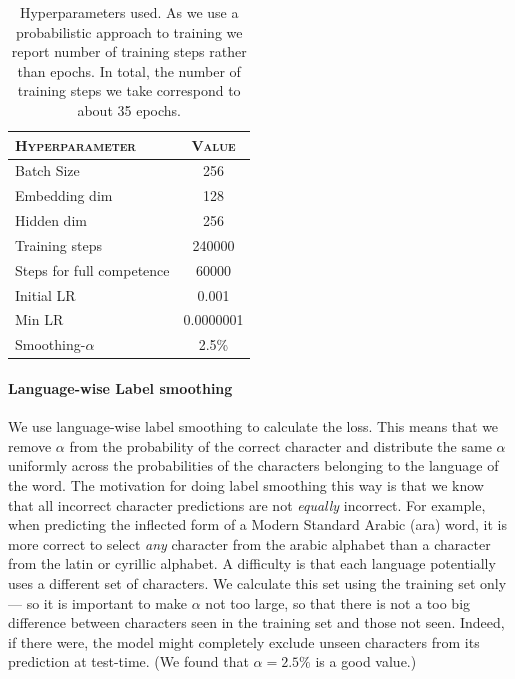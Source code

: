 \documentclass[11pt,a4paper]{article}
\begin{document}
\begin{table}[ht!]	
\centering
\begin{tabular}{lc}
\textsc{Hyperparameter} & \textsc{Value} \\
  \hline
  Batch Size & 256 \\
  Embedding dim & 128 \\
  Hidden dim & 256 \\
  Training steps & 240000 \\
  Steps for full competence & 60000 \\
  Initial LR & 0.001 \\
  Min LR & 0.0000001 \\
  Smoothing-$\alpha$ & 2.5\%
\end{tabular} 
\caption{Hyperparameters used. As we use a probabilistic approach to
training we report number of training steps rather than epochs. In
total, the number of training steps we take correspond to about 35
epochs.}
\label{tab:hp}
\end{table}


\paragraph{Language-wise Label smoothing} We use language-wise label
smoothing to calculate the loss. This means that we remove $\alpha$
from the probability of the correct character and distribute the same
$\alpha$ uniformly across the probabilities of the characters
belonging to the language of the word. The motivation for doing label
smoothing this way is that we know that all incorrect character
predictions are not \emph{equally} incorrect. For example, when
predicting the inflected form of a Modern Standard Arabic (ara) word,
it is more correct to select \emph{any} character from the arabic
alphabet than a character from the latin or cyrillic alphabet.  A
difficulty is that each language potentially uses a different set of
characters. We calculate this set using the training set only--- so it
is important to make $\alpha$ not too large, so that there is not a
too big difference between characters seen in the training set and
those not seen.  Indeed, if there were, the model might completely
exclude unseen characters from its prediction at test-time. (We found
that \(\alpha=2.5\%\) is a good value.)

\end{document}
